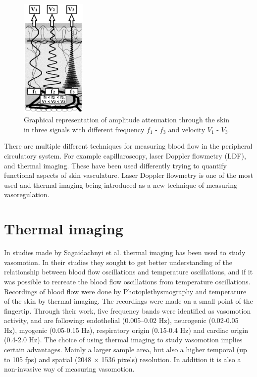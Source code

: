 \begin{figure}[H]
	\centering	\includegraphics[width=0.28\textwidth]{figures/attenuation}
	\caption{Graphical representation of amplitude attenuation through the skin in three signals with different frequency $f_{1}$ - $f_{3}$ and velocity $V_{1}$ - $V_{3}$.\cite{sagaidachnyi2014}}
	\label{fig:atten}
\end{figure} \vspace{-.3cm}

There are multiple different techniques for measuring blood flow in the peripheral circulatory system. For example capillaroscopy, laser Doppler flowmetry (LDF), and thermal imaging. These have been used differently trying to quantify functional aspects of skin vasculature.\cite{liu2012} Laser Doppler flowmetry is one of the most used\cite{geyer2004} and thermal imaging being introduced as a new technique of measuring vasoregulation\cite{sagaidachnyi2014}.

\section{Thermal imaging}
\label{sec:thermalImaging}
In studies made by Sagaidachnyi et al. thermal imaging has been used to study vasomotion. In their studies they sought to get better understanding of the relationship between blood flow oscillations and temperature oscillations, and if it was possible to recreate the blood flow oscillations from temperature oscillations. Recordings of blood flow were done by Photoplethysmography and temperature of the skin by thermal imaging. The recordings were made on a small point of the fingertip. Through their work, five frequency bands were identified as vasomotion activity, and are following: endothelial (0.005–0.02 Hz), neurogenic (0.02-0.05 Hz), myogenic (0.05-0.15 Hz), respiratory origin (0.15-0.4 Hz) and cardiac origin (0.4-2.0 Hz).\cite{sagaidachnyi2014,sagaidachnyi2017}
The choice of using thermal imaging to study vasomotion implies certain advantages. Mainly a larger sample area, but also a higher temporal (up to 105 fps) and spatial (2048 × 1536 pixels) resolution. In addition it is also a non-invasive way of measuring vasomotion.\cite{sagaidachnyi2017}

